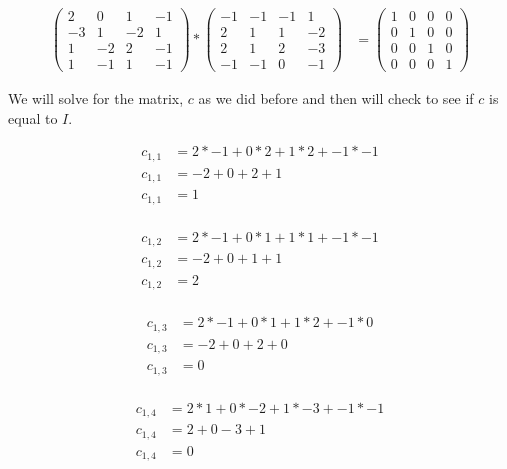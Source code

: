 \documentclass[12pt]{article}
\begin{document}
\begin{itemize}
\begin{align*}
    \begin{pmatrix}
    2 & 0 & 1 & -1\\
    -3 & 1 & -2 & 1 \\
    1 & -2 & 2 & -1 \\
    1 & -1 & 1 & -1
    \end{pmatrix} *
    \begin{pmatrix}
    -1 & -1 & -1 & 1\\
    2 & 1 & 1 & -2 \\
    2 & 1 & 2 & -3 \\
    -1 & -1 & 0 & -1
    \end{pmatrix} &= 
    \begin{pmatrix}
    1 & 0 & 0 & 0 \\
    0 & 1 & 0 & 0 \\
    0 & 0 & 1 & 0 \\
    0 & 0 & 0 & 1
    \end{pmatrix}
\end{align*}

We will solve for the matrix, $c$ as we did before and then will check to see if $c$ is equal to $I$. 

\begin{align*}
    c_{1,1} &= 2 * -1 + 0 * 2 + 1 * 2 + -1 * -1 \\
    c_{1,1} &= -2 + 0 + 2 + 1 \\
    c_{1,1} &= 1 \\
\end{align*}

\begin{align*}
    c_{1,2} &= 2 * -1 + 0 * 1 + 1 * 1 + -1 * -1 \\
    c_{1,2} &= -2 + 0 + 1 + 1 \\
    c_{1,2} &= 2 \\
\end{align*}

\begin{align*}
    c_{1,3} &= 2 * -1 + 0 * 1 + 1 * 2 + -1 * 0 \\
    c_{1,3} &= -2 + 0 + 2 + 0 \\
    c_{1,3} &= 0 \\
\end{align*}

\begin{align*}
    c_{1,4} &= 2 * 1 + 0 * -2 + 1 * -3 + -1 * -1 \\
    c_{1,4} &= 2 + 0 - 3 + 1 \\
    c_{1,4} &= 0 \\
\end{align*}


\end{itemize}
\end{document}
